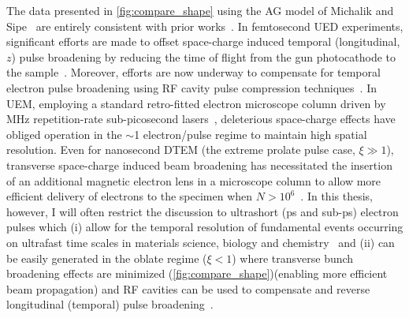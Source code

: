 The data presented in \ref{fig:compare_shape} using the AG model of Michalik and Sipe~\cite{michalik_analytic_2006} are entirely consistent with prior works~\cite{reed_femtosecond_2006,siwick_ultrafast_2002}.
In femtosecond UED experiments, significant efforts are made to offset space-charge induced temporal (longitudinal, $z$) pulse broadening by reducing the time of flight from the gun photocathode to the sample~\cite{siwick_ultrafast_2002,reed_evolution_2009}.
Moreover, efforts are now underway to compensate for temporal electron pulse broadening using RF cavity pulse compression techniques~\cite{oudheusden_electron_2007}.
In UEM, employing a standard retro-fitted electron microscope column driven by MHz repetition-rate sub-picosecond lasers~\cite{lobastov_four-dimensional_2005}, deleterious space-charge effects have obliged operation in the $\sim$1 electron/pulse regime to maintain high spatial resolution.
Even for nanosecond DTEM (the extreme prolate pulse case, $\xi \gg 1 $), transverse space-charge induced beam broadening has necessitated the insertion of an additional magnetic electron lens in a microscope column to allow more efficient delivery of electrons to the specimen when $ N > 10^{6} $~\cite{lagrange_nanosecond_2008}.
In this thesis, however, I will often restrict the discussion to ultrashort (ps and sub-ps) electron pulses which (i) allow for the temporal resolution of fundamental events occurring on ultrafast time scales in materials science, biology and chemistry~\cite{king_ultrafast_2005} and (ii) can be easily generated in the oblate regime ($ \xi < 1 $) where transverse bunch broadening effects are minimized (\ref{fig:compare_shape})(enabling more efficient beam propagation) and RF cavities can be used to compensate and reverse longitudinal (temporal) pulse broadening~\cite{veisz_hybrid_2007}.

